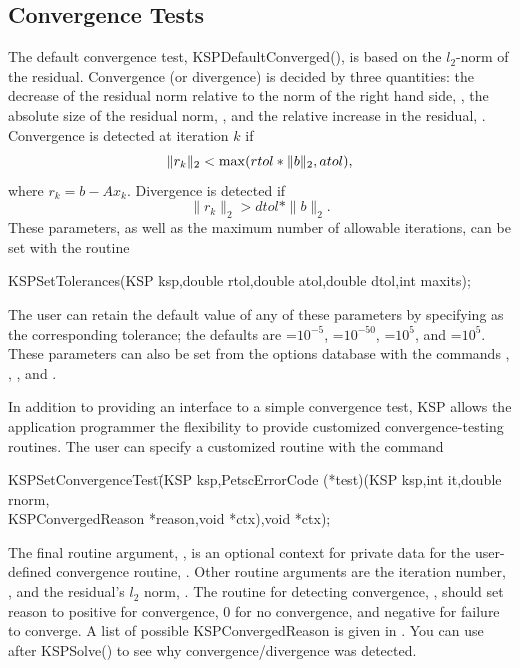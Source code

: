 \subsection{Convergence Tests}
\label{section_convergencetests}

The default convergence test, KSPDefaultConverged(), is 
based on the $l_2$-norm of the residual. Convergence 
(or divergence) is decided by three quantities:
the decrease of the residual norm relative to the norm of the right hand side, , the absolute 
size of the residual norm, , and the relative increase in the 
residual, .  Convergence is detected at iteration $ k $ if
\[  \| r_k \|_2 < {\rm max} ( rtol * \| b \|_2, atol), \]
where $r_k = b - A x_k$.  Divergence is detected if
\[  \| r_k \|_2 > dtol * \| b \|_2. \]
These parameters, as well as the maximum number of allowable iterations, 
can be set with the routine 
\begin{tabbing}
  KSPSetTolerances(KSP ksp,double rtol,double atol,double dtol,int maxits);
\end{tabbing}
The user can retain the default value of any of these parameters by
specifying   as the 
corresponding tolerance; the
defaults are =$10^{-5}$, =$10^{-50}$,
=$10^{5}$, and =$10^5$.
These parameters can also be set from the options database with the 
commands  ,  ,  ,
  
and  . 

In addition to providing an interface to a simple convergence test,
KSP allows the application programmer the flexibility to provide 
customized convergence-testing routines.  
The user can specify a customized 
routine with the command 
\begin{tabbing}
  KSPSetConvergenceTest\=(KSP ksp,PetscErrorCode (*test)(KSP ksp,int it,double rnorm,\\
                       \>KSPConvergedReason *reason,void *ctx),void *ctx);
\end{tabbing}
The final routine argument, , is an optional context for private
data for the user-defined convergence routine, .  Other
 routine arguments are the iteration
number, , and the residual's $ l_2 $ norm, .
The routine for detecting convergence, , should set reason to 
positive for convergence, 0 for no convergence, and negative for 
failure to converge.  A list of possible KSPConvergedReason is given
 in .
 You can use  after KSPSolve() to see why
convergence/divergence was detected.

